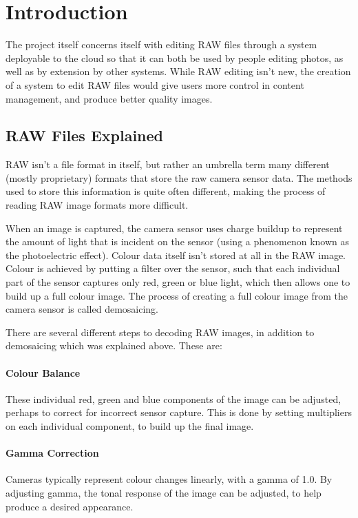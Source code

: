 \documentclass[10pt,a4paper]{article}
\begin{document}
\section{Introduction}

The project itself concerns itself with editing RAW files through a system deployable to the cloud
so that it can both be used by people editing photos, as well as by extension by other systems. While RAW
editing isn't new, the creation of a system to edit RAW files would give users more control in content management,
and produce better quality images.

\subsection{RAW Files Explained}
RAW isn't a file format in itself, but rather an umbrella term many different (mostly proprietary) formats that store the
raw camera sensor data. The methods used to store this information is quite often different, making the process of reading
RAW image formats more difficult.

When an image is captured, the camera sensor uses charge buildup to represent the amount of light that is incident on the sensor
(using a phenomenon known as the photoelectric effect). Colour data itself isn't stored at all in the RAW image. Colour is achieved
by putting a filter over the sensor, such that each individual part of the sensor captures only red, green or blue light, which then
allows one to build up a full colour image. The process of creating a full colour image from the camera sensor is called demosaicing. 
\cite{UnderstandingRAWCapture}

There are several different steps to decoding RAW images, in addition to demosaicing which was explained above. These are:

\paragraph{Colour Balance}
These individual red, green and blue components of the image can be adjusted, perhaps to correct for incorrect sensor capture.
This is done by setting multipliers on each individual component, to build up the final image.
\paragraph{Gamma Correction}
Cameras typically represent colour changes linearly, with a gamma of 1.0. 
By adjusting gamma, the tonal response of the image can be adjusted, to help produce a desired appearance.
\end{document}
